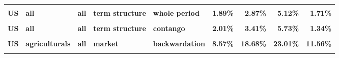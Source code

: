 \documentclass[
  authoryear,
  preprint,
  3p]{elsarticle}
\begin{document}
\begin{landscape}
\begin{longtable}[t]{>{}l>{}l>{}l>{}l>{}l>{}r>{}r>{}r>{}r}
\addlinespace
\textbf{\cellcolor{gray!10}{US}} & \textbf{\cellcolor{gray!10}{all}} & \textbf{\cellcolor{gray!10}{all}} & \textbf{\cellcolor{gray!10}{open interest}} & \textbf{\cellcolor{gray!10}{contango}} & \textcolor[HTML]{4285f4}{\textbf{\cellcolor{gray!10}{7.95\%}}} & \textcolor[HTML]{4285f4}{\textbf{\cellcolor{gray!10}{7.61\%}}} & \textcolor[HTML]{4285f4}{\textbf{\cellcolor{gray!10}{5.24\%}}} & \textcolor[HTML]{4285f4}{\textbf{\cellcolor{gray!10}{5.82\%}}}\\
\textbf{US} & \textbf{all} & \textbf{all} & \textbf{term structure} & \textbf{whole period} & \textcolor[HTML]{4285f4}{\textbf{1.89\%}} & \textcolor[HTML]{4285f4}{\textbf{2.87\%}} & \textcolor[HTML]{4285f4}{\textbf{5.12\%}} & \textcolor[HTML]{4285f4}{\textbf{1.71\%}}\\
\textbf{\cellcolor{gray!10}{US}} & \textbf{\cellcolor{gray!10}{all}} & \textbf{\cellcolor{gray!10}{all}} & \textbf{\cellcolor{gray!10}{term structure}} & \textbf{\cellcolor{gray!10}{backwardation}} & \textcolor[HTML]{4285f4}{\textbf{\cellcolor{gray!10}{2.3\%}}} & \textcolor[HTML]{4285f4}{\textbf{\cellcolor{gray!10}{2.78\%}}} & \textcolor[HTML]{4285f4}{\textbf{\cellcolor{gray!10}{4.79\%}}} & \textcolor[HTML]{4285f4}{\textbf{\cellcolor{gray!10}{2.85\%}}}\\
\textbf{US} & \textbf{all} & \textbf{all} & \textbf{term structure} & \textbf{contango} & \textcolor[HTML]{4285f4}{\textbf{2.01\%}} & \textcolor[HTML]{4285f4}{\textbf{3.41\%}} & \textcolor[HTML]{4285f4}{\textbf{5.73\%}} & \textcolor[HTML]{4285f4}{\textbf{1.34\%}}\\
\textbf{\cellcolor{gray!10}{US}} & \textbf{\cellcolor{gray!10}{agriculturals}} & \textbf{\cellcolor{gray!10}{all}} & \textbf{\cellcolor{gray!10}{market}} & \textbf{\cellcolor{gray!10}{whole period}} & \textcolor[HTML]{4285f4}{\textbf{\cellcolor{gray!10}{9.08\%}}} & \textcolor[HTML]{4285f4}{\textbf{\cellcolor{gray!10}{16.04\%}}} & \textcolor[HTML]{4285f4}{\textbf{\cellcolor{gray!10}{25.99\%}}} & \textcolor[HTML]{4285f4}{\textbf{\cellcolor{gray!10}{12.07\%}}}\\
\addlinespace
\textbf{US} & \textbf{agriculturals} & \textbf{all} & \textbf{market} & \textbf{backwardation} & \textcolor[HTML]{4285f4}{\textbf{8.57\%}} & \textcolor[HTML]{4285f4}{\textbf{18.68\%}} & \textcolor[HTML]{4285f4}{\textbf{23.01\%}} & \textcolor[HTML]{4285f4}{\textbf{11.56\%}}\\
\textbf{\cellcolor{gray!10}{US}} & \textbf{\cellcolor{gray!10}{agriculturals}} & \textbf{\cellcolor{gray!10}{all}} & \textbf{\cellcolor{gray!10}{market}} & \textbf{\cellcolor{gray!10}{contango}} & \textcolor[HTML]{4285f4}{\textbf{\cellcolor{gray!10}{9.85\%}}} & \textcolor[HTML]{4285f4}{\textbf{\cellcolor{gray!10}{13.5\%}}} & \textcolor[HTML]{4285f4}{\textbf{\cellcolor{gray!10}{28.67\%}}} & \textcolor[HTML]{4285f4}{\textbf{\cellcolor{gray!10}{12.91\%}}}\\

\end{longtable}
\end{landscape}
\end{document}
